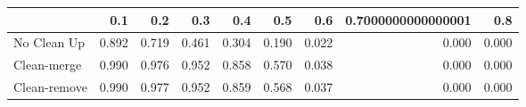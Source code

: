 \begin{tabular}{lrrrrrrrr}
\toprule
{} &   0.1 &   0.2 &   0.3 &   0.4 &   0.5 &   0.6 & 0.7000000000000001 &   0.8 \\
\midrule
No Clean Up  & 0.892 & 0.719 & 0.461 & 0.304 & 0.190 & 0.022 &              0.000 & 0.000 \\
Clean-merge  & 0.990 & 0.976 & 0.952 & 0.858 & 0.570 & 0.038 &              0.000 & 0.000 \\
Clean-remove & 0.990 & 0.977 & 0.952 & 0.859 & 0.568 & 0.037 &              0.000 & 0.000 \\
\bottomrule
\end{tabular}
